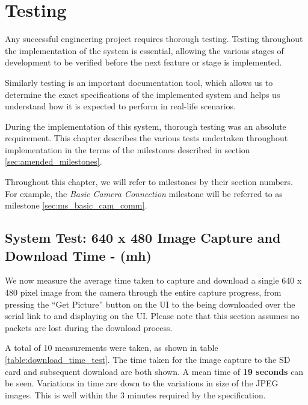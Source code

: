 \chapter{Testing}
Any successful engineering project requires thorough testing. Testing throughout
the implementation of the system is essential, allowing the various stages of 
development to be verified before the next feature or stage is implemented.

Similarly testing is an important documentation tool, which allows us to determine the
exact specifications of the implemented system and helps us understand how it is 
expected to perform in real-life scenarios.

During the implementation of this system, thorough testing was an absolute
requirement. This chapter describes the various tests undertaken
throughout implementation in the terms of the milestones described in section
\ref{sec:amended_milestones}. 

Throughout this chapter, we will refer to milestones by their section numbers.
For example, the \emph{Basic Camera Connection} milestone will be referred
to as milestone \ref{sec:ms_basic_cam_comm}.









\section{System Test: 640 x 480 Image Capture and Download Time - (mh)}

We now measure the average time taken to capture and download a single 640 x 480
pixel image from the camera through the entire capture progress, from pressing the 
``Get Picture'' button on the UI to the being downloaded over the serial link to and
displaying on the UI. Please note that this section assumes no packets are lost during
the download process.

A total of 10 measurements were taken, as shown in table \ref{table:download_time_test}.
The time taken for the image capture to the SD card and subsequent download are both
shown. A mean time of \textbf{19 seconds} can be seen. Variations in time are down to the
variations in size of the JPEG images. This is well within the 3 minutes required by the specification.

